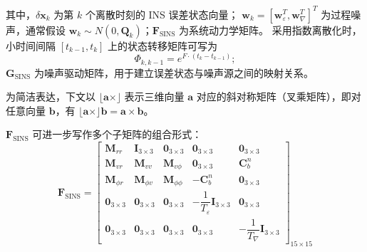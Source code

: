 其中，$\delta \bm{x}_k$ 为第 $k$ 个离散时刻的 INS 误差状态向量；
$\bm{w}_k = [\bm{w}_\varepsilon^T, \bm{w}_\nabla^T]^T$ 为过程噪声，通常假设
$\bm{w}_k \sim N(0, \bm{Q}_k)$；$\bm{F}_{\text{SINS}}$ 为系统动力学矩阵。
采用指数离散化时，小时间间隔 $[t_{k-1}, t_k]$ 上的状态转移矩阵可写为
\[
    \Phi_{k,k-1} = e^{F \cdot (t_k - t_{k-1})};
\]
$\bm{G}_{\text{SINS}}$ 为噪声驱动矩阵，用于建立误差状态与噪声源之间的映射关系。

为简洁表达，下文以 $\lfloor \bm{a} \times \rfloor$ 表示三维向量 $\bm{a}$ 对应的斜对称矩阵（叉乘矩阵），即对任意向量 $\bm{b}$，有 $\lfloor \bm{a} \times \rfloor \bm{b} = \bm{a} \times \bm{b}$。

$\bm{F}_\text{SINS}$ 可进一步写作多个子矩阵的组合形式：
\begin{equation}
    \bm{F}_\text{SINS} =
    \begin{bmatrix}
        \bm{M}_{rr}       & \bm{I}_{3\times3} & \bm{0}_{3\times3} & \bm{0}_{3\times3}                          & \bm{0}_{3\times3}                     \\[4pt]
        \bm{M}_{vr}       & \bm{M}_{vv}       & \bm{M}_{v\phi}    & \bm{0}_{3\times3}                          & \bm{C}_b^n                            \\[4pt]
        \bm{M}_{\phi r}   & \bm{M}_{\phi v}   & \bm{M}_{\phi\phi} & -\bm{C}_b^n                                & \bm{0}_{3\times3}                     \\[4pt]
        \bm{0}_{3\times3} & \bm{0}_{3\times3} & \bm{0}_{3\times3} & -\dfrac{1}{T_\varepsilon}\bm{I}_{3\times3} & \bm{0}_{3\times3}                     \\[4pt]
        \bm{0}_{3\times3} & \bm{0}_{3\times3} & \bm{0}_{3\times3} & \bm{0}_{3\times3}                          & -\dfrac{1}{T_\nabla}\bm{I}_{3\times3}
    \end{bmatrix}_{15\times15}
\end{equation}


